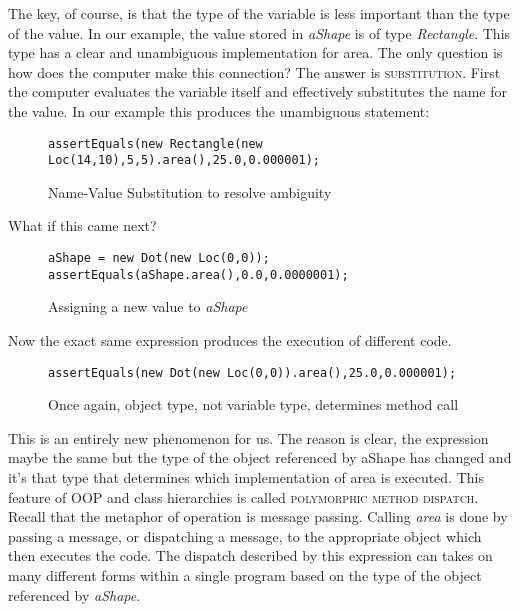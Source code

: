 \documentclass[nobib]{tufte-handout}
\begin{document}
The key, of course, is that the type of the variable is less important than the type of the value. In our example, the value stored in \textit{aShape} is of type \textit{Rectangle}. This type has a clear and unambiguous implementation for area. The only question is how does the computer make this connection? The answer is \textsc{substitution}.
First the computer evaluates the variable itself and effectively substitutes the name for the value. In our example this produces the unambiguous statement:
\begin{figure}
\begin{lstlisting}
assertEquals(new Rectangle(new Loc(14,10),5,5).area(),25.0,0.000001);
\end{lstlisting}
\caption{Name-Value Substitution to resolve ambiguity}
\end{figure}

What if this came next?
\begin{figure}
\begin{lstlisting}
aShape = new Dot(new Loc(0,0));
assertEquals(aShape.area(),0.0,0.0000001);
\end{lstlisting}
\caption{Assigning a new value to \textit{aShape}}
\end{figure}

Now the exact same expression produces the execution of different code.
\begin{figure}
\begin{lstlisting}
assertEquals(new Dot(new Loc(0,0)).area(),25.0,0.000001);
\end{lstlisting}
\caption{Once again, object type, not variable type, determines method call}
\end{figure}

This is an entirely new phenomenon for us. The reason is clear, the expression maybe the same but the type of the object referenced by aShape has changed and it's that type that determines which implementation of area is executed. This feature of OOP and class hierarchies is called \textsc{polymorphic method dispatch}. Recall that the metaphor of operation is message passing. Calling \textit{area} is done by passing a message, or dispatching a message, to the appropriate object which then executes the code. The dispatch described by this expression can takes on many different forms within a single program based on the type of the object referenced by \textit{aShape}.
\end{document}
